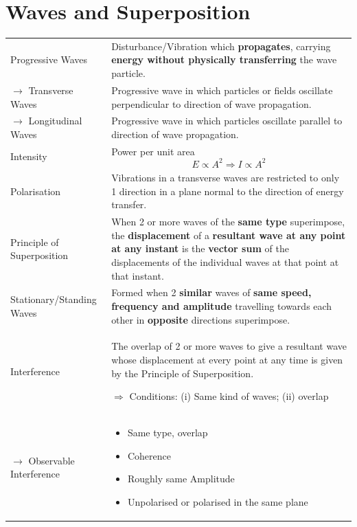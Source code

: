 \documentclass[a4paper,11pt]{article}
\begin{document}
	\section{Waves and Superposition}
	\begin{center}
		\renewcommand{\arraystretch}{1.5}
		\begin{tabular}{@{} l p{10cm} @{}}
			\toprule
			Progressive Waves & Disturbance/Vibration which \textbf{propagates}, carrying \textbf{energy without physically transferring} the wave particle. \\
			$\rightarrow$ Transverse Waves & Progressive wave in which particles or fields oscillate perpendicular to direction of wave propagation. \\ 
			$\rightarrow$ Longitudinal Waves & Progressive wave in which particles oscillate parallel to direction of wave propagation. \\
			Intensity & Power per unit area $$E \propto A^2 \Rightarrow I \propto A^2$$ \vspace*{-\baselineskip}\\
			Polarisation & Vibrations in a transverse waves are restricted to only 1 direction in a plane normal to the direction of energy transfer. \\ 
			Principle of Superposition & When 2 or more waves of the \textbf{same type} superimpose, the \textbf{displacement} of a \textbf{resultant wave at any point at any instant} is the \textbf{vector sum} of the displacements of the individual waves at that point at that instant.\\
			Stationary/Standing Waves & Formed when 2 \textbf{similar} waves of \textbf{same speed, frequency and amplitude} travelling towards each other in \textbf{opposite} directions superimpose. \\
			Interference & The overlap of 2 or more waves to give a resultant wave whose displacement at every point at any time is given by the Principle of Superposition. \par $\Rightarrow$ Conditions: (i) Same kind of waves; (ii) overlap\\
			$\rightarrow$ Observable Interference & 
			\begin{minipage}[t]{\textwidth}%
				\begin{itemize}
					\item Same type, overlap
					\item Coherence 
					\item Roughly same Amplitude 
					\item Unpolarised or polarised in the same plane 

\end{itemize}
\end{minipage}
\end{tabular}
\end{center}
\end{document}
